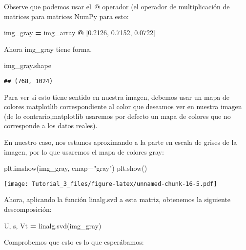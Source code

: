 \documentclass[
]{article}
\newenvironment{Shaded}{\begin{snugshade}}{\end{snugshade}}
\newcommand{\FloatTok}[1]{\textcolor[rgb]{0.00,0.00,0.81}{#1}}
\newcommand{\NormalTok}[1]{#1}
\newcommand{\OperatorTok}[1]{\textcolor[rgb]{0.81,0.36,0.00}{\textbf{#1}}}
\newcommand{\StringTok}[1]{\textcolor[rgb]{0.31,0.60,0.02}{#1}}
\begin{document}
Observe que podemos usar el~@ operador (el operador de multiplicación de
matrices para matrices NumPy para esto:

\begin{Shaded}
\begin{Highlighting}[]
\NormalTok{img\_gray }\OperatorTok{=}\NormalTok{ img\_array }\OperatorTok{@}\NormalTok{ [}\FloatTok{0.2126}\NormalTok{, }\FloatTok{0.7152}\NormalTok{, }\FloatTok{0.0722}\NormalTok{]}
\end{Highlighting}
\end{Shaded}

Ahora img\_gray tiene forma.

\begin{Shaded}
\begin{Highlighting}[]
\NormalTok{img\_gray.shape}
\end{Highlighting}
\end{Shaded}

\begin{verbatim}
## (768, 1024)
\end{verbatim}

Para ver si esto tiene sentido en nuestra imagen, debemos usar un mapa
de colores matplotlib correspondiente al color que deseamos ver en
nuestra imagen (de lo contrario,matplotlib usaremos por defecto un mapa
de colores que no corresponde a los datos reales).

En nuestro caso, nos estamos aproximando a la parte en escala de grises
de la imagen, por lo que usaremos el mapa de colores gray:

\begin{Shaded}
\begin{Highlighting}[]
\NormalTok{plt.imshow(img\_gray, cmap}\OperatorTok{=}\StringTok{"gray"}\NormalTok{)}
\NormalTok{plt.show()}
\end{Highlighting}
\end{Shaded}

\texttt{[image: Tutorial\_3\_files/figure-latex/unnamed-chunk-16-5.pdf]}

Ahora, aplicando la función linalg.svd a esta matriz, obtenemos la
siguiente descomposición:

\begin{Shaded}
\begin{Highlighting}[]
\NormalTok{U, s, Vt }\OperatorTok{=}\NormalTok{ linalg.svd(img\_gray)}
\end{Highlighting}
\end{Shaded}

Comprobemos que esto es lo que esperábamos:
\end{document}
